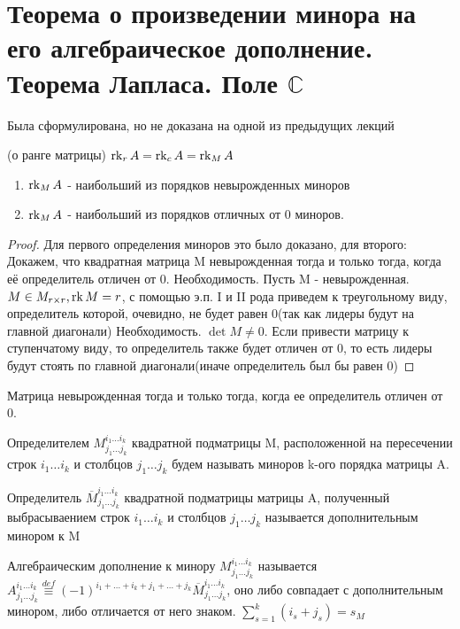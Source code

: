 \section{Теорема о произведении минора на его алгебраическое дополнение. Теорема Лапласа. Поле \(\mathbb{C}\)}
Была сформулирована, но не доказана на одной из предыдущих лекций
\begin{theorem}
	\label{frobenius}
	(о ранге матрицы)
	\(\operatorname{rk}_r A= \operatorname{rk}_c A = \operatorname{rk}_MA\)
	\begin{enumerate}
		\item \(\operatorname{rk}_MA\) - наибольший из порядков невырожденных миноров
		\item \(\operatorname{rk}_MA\) - наибольший из порядков отличных от 0 миноров.
	\end{enumerate}
\end{theorem}
\begin{proof}
	Для первого определения миноров это было доказано, для второго: Докажем, что квадратная матрица M невырожденная тогда и только тогда, когда её определитель отличен от 0. 
	\newline
	Необходимость. Пусть M - невырожденная. \(M\in M_{r\times r}, \operatorname{rk} M = r\), с помощью э.п. I и II рода приведем к треугольному виду, определитель которой, очевидно, не будет равен 0(так как лидеры будут на главной диагонали) \newline
	Необходимость. \(\det M\ne 0\). Если привести матрицу к ступенчатому виду, то определитель также будет отличен от 0, то есть лидеры будут стоять по главной диагонали(иначе определитель был бы равен 0)
\end{proof}
\begin{corollary}
	Матрица невырожденная тогда и только тогда, когда ее определитель отличен от 0.
\end{corollary}
\begin{definition}
	Определителем \(M_{j_1\ldots j_k}^{i_1\ldots i_k}\) квадратной подматрицы M, расположенной на пересечении строк \(i_1\ldots i_k\) и столбцов \(j_1\ldots j_k\) будем называть миноров k-ого порядка матрицы A.
\end{definition}
\begin{definition}
	Определитель \(\overline{M}_{j_1\ldots j_k}^{i_1\ldots i_k}\)  квадратной подматрицы матрицы A, полученный выбрасываением строк \(i_1\ldots i_k\) и столбцов \(j_1\ldots j_k\) называется дополнительным минором к M
\end{definition}
\begin{definition}
	Алгебраическим дополнение к минору \(M_{j_1\ldots j_k}^{i_1\ldots i_k}\) называется \(A_{j_1\ldots j_k}^{i_1\ldots i_k}\overset{def}{\equiv} (-1)^{i_1+\ldots + i_k+j_1+\ldots + j_k}\overline{M}_{j_1\ldots j_k}^{i_1\ldots i_k}\), оно либо совпадает с дополнительным минором, либо отличается от него знаком. \(\sum_{s=1}^{k}(i_s+j_s) = s_M\)
\end{definition}
